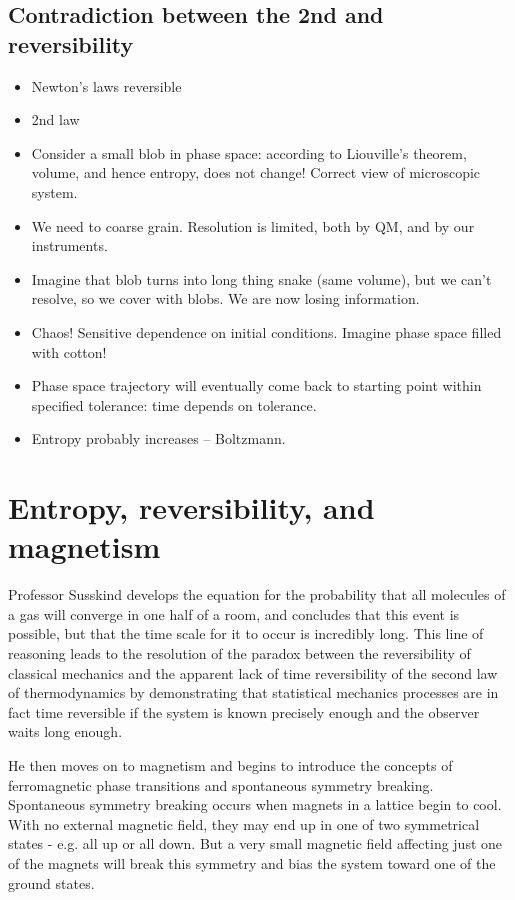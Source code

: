 \documentclass[]{article}
\begin{document}
\subsection{Contradiction between the 2nd and reversibility}
\begin{itemize}
	\item Newton's laws reversible
	\item 2nd law
	\item Consider a small blob in phase space: according to Liouville's theorem, volume, and hence entropy, does not change! Correct view of microscopic system.
	\item We need to coarse grain. Resolution is limited, both by QM, and by our instruments.
	\item Imagine that blob turns into long thing snake (same volume), but we can't resolve, so we cover with blobs. We are now losing information. 
	\item Chaos! Sensitive dependence on initial conditions. Imagine phase space filled with cotton!
	
	\item Phase space trajectory will eventually come back to starting point within specified tolerance: time depends on tolerance.
	
	\item Entropy probably increases -- Boltzmann. 
\end{itemize}





\section{Entropy, reversibility, and magnetism}



Professor Susskind develops the equation for the probability that all molecules of a gas will converge in one half of a room, and concludes that this event is possible, but that the time scale for it to occur is incredibly long.  This line of reasoning leads to the resolution of the paradox between the reversibility of classical mechanics and the apparent lack of time reversibility of the second law of thermodynamics by demonstrating that statistical mechanics processes are in fact time reversible if the system is known precisely enough and the observer waits long enough.

He then moves on to magnetism and begins to introduce the concepts of ferromagnetic phase transitions and spontaneous symmetry breaking.  Spontaneous symmetry breaking occurs when magnets in a lattice begin to cool.  With no external magnetic field, they may end up in one of two symmetrical states - e.g. all up or all down.  But a very small magnetic field affecting just one of the magnets will break this symmetry and bias the system toward one of the ground states.
\end{document}
